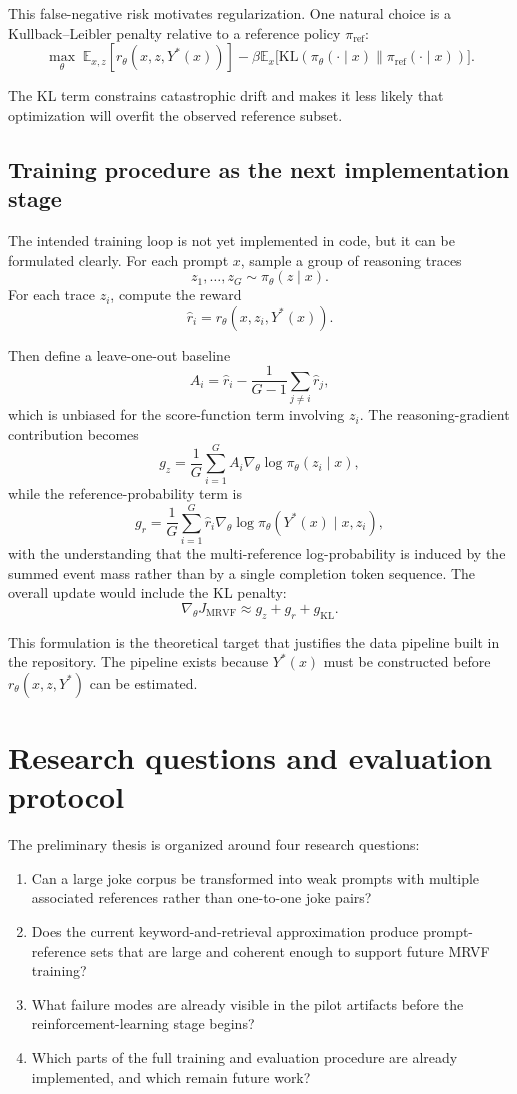 \documentclass[14pt,a4paper]{extreport}
\begin{document}
This false-negative risk motivates regularization. One natural choice is a Kullback--Leibler penalty relative to a reference policy \(\pi_{\text{ref}}\):
\[
  \max_{\theta}
  \;
  \mathbb{E}_{x,z}[r_{\theta}(x,z,Y^{*}(x))]
  -
  \beta
  \mathbb{E}_{x}\big[
    \mathrm{KL}(\pi_{\theta}(\cdot\mid x)\|\pi_{\text{ref}}(\cdot\mid x))
    \big].
\]

The KL term constrains catastrophic drift and makes it less likely that optimization will overfit the observed reference subset.

\subsection{Training procedure as the next implementation stage}

The intended training loop is not yet implemented in code, but it can be formulated clearly. For each prompt \(x\), sample a group of reasoning traces
\[
  z_1,\dots,z_G\sim\pi_{\theta}(z\mid x).
\]
For each trace \(z_i\), compute the reward
\[
  \hat r_i=r_{\theta}(x,z_i,Y^{*}(x)).
\]

Then define a leave-one-out baseline
\[
  A_i=
  \hat r_i-\frac{1}{G-1}\sum_{j\neq i}\hat r_j,
\]
which is unbiased for the score-function term involving \(z_i\). The reasoning-gradient contribution becomes
\[
  g_z=
  \frac{1}{G}\sum_{i=1}^{G}
  A_i\nabla_{\theta}\log\pi_{\theta}(z_i\mid x),
\]
while the reference-probability term is
\[
  g_r=
  \frac{1}{G}\sum_{i=1}^{G}
  \hat r_i\nabla_{\theta}\log\pi_{\theta}(Y^{*}(x)\mid x,z_i),
\]
with the understanding that the multi-reference log-probability is induced by the summed event mass rather than by a single completion token sequence. The overall update would include the KL penalty:
\[
  \nabla_{\theta}J_{\text{MRVF}} \approx g_z + g_r + g_{\text{KL}}.
\]

This formulation is the theoretical target that justifies the data pipeline built in the repository. The pipeline exists because \(Y^{*}(x)\) must be constructed before \(r_{\theta}(x,z,Y^{*})\) can be estimated.

\section{Research questions and evaluation protocol}

The preliminary thesis is organized around four research questions:
\begin{enumerate}
  \item Can a large joke corpus be transformed into weak prompts with multiple associated references rather than one-to-one joke pairs?
  \item Does the current keyword-and-retrieval approximation produce prompt-reference sets that are large and coherent enough to support future MRVF training?
  \item What failure modes are already visible in the pilot artifacts before the reinforcement-learning stage begins?
  \item Which parts of the full training and evaluation procedure are already implemented, and which remain future work?
\end{enumerate}
\end{document}
